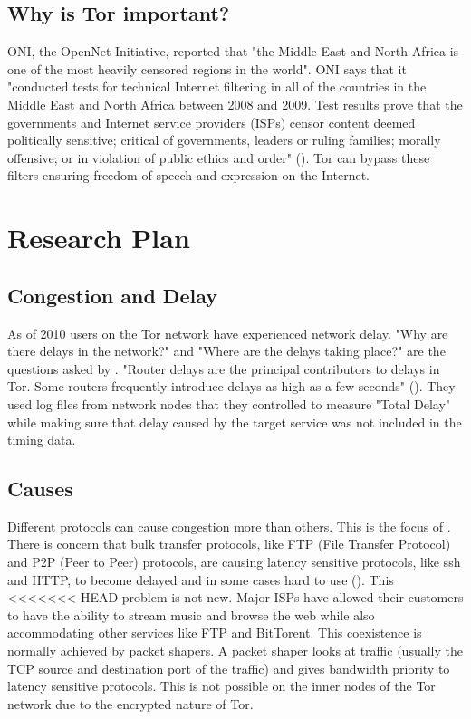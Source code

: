 \documentclass[letterpaper,13pt]{texMemo}
\begin{document}
    \subsection*{Why is Tor important?}
    ONI, the OpenNet Initiative, reported that "the Middle East and North Africa is one of the most
    heavily censored regions in the world". ONI says that it "conducted tests for technical
    Internet filtering in all of the countries in the Middle East and North Africa between 2008 and
    2009. Test results prove that the governments and Internet service providers (ISPs) censor
    content deemed politically sensitive; critical of governments, leaders or ruling families;
    morally offensive; or in violation of public ethics and order" (\citeauthor[6]{ONI}). Tor can
    bypass these filters ensuring freedom of speech and expression on the Internet.

\section*{Research Plan}


    \subsection*{Congestion and Delay}
    As of 2010 users on the Tor network have experienced network delay.  "Why are there delays in
    the network?" and "Where are the delays taking place?" are the questions asked by
    \citeauthor[]{delay}. "Router delays are the principal contributors to delays in Tor. Some
    routers frequently introduce delays as high as a few seconds" (\citeauthor[3]{delay}). They used
    log files from network nodes that they controlled to measure "Total Delay" while making sure
    that delay caused by the target service was not included in the timing data.

    \subsection*{Causes}
    Different protocols can cause congestion more than others. This is the focus of
    \citeauthor{analysis}. There is concern that bulk transfer protocols, like FTP (File Transfer
    Protocol) and P2P (Peer to Peer) protocols, are causing latency sensitive protocols, like ssh
    and HTTP, to become delayed and in some cases hard to use (\citeauthor[2]{analysis}). This
<<<<<<< HEAD
    problem is not new. Major ISPs have allowed their customers to have
    the ability to stream music and browse the web while also accommodating other services like FTP
    and BitTorent. This coexistence is normally achieved by packet shapers. A packet shaper looks
    at traffic (usually the TCP source and destination port of the traffic) and gives bandwidth priority
    to latency sensitive protocols. This is not possible on the inner nodes of the Tor network due
    to the encrypted nature of Tor.
\end{document}

